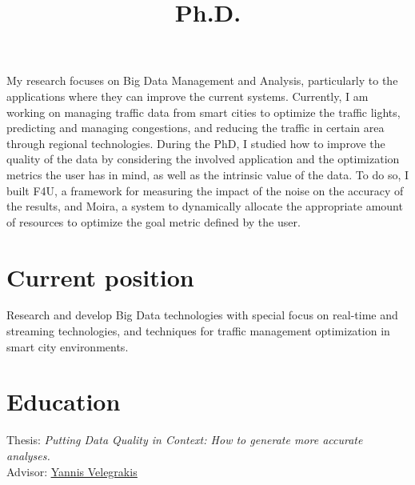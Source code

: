 \documentclass[10pt,a4paper,colorlinks,linkcolor=true]{moderncv}
\title{Ph.D.}
\newcommand{\cvlink}[2]{\href{#1}{\ul{#2}}}
\begin{document}
\hypersetup{urlcolor=color1}

\makecvtitle
\pagestyle{empty} %
\setlength{\parskip}{0.4ex}

\vspace*{-5mm}

My research focuses on Big Data Management and Analysis, particularly to the applications where they can improve the current systems.
Currently, I am working on managing traffic data from smart cities to optimize the traffic lights, predicting and managing congestions, and reducing the traffic in certain area through regional technologies.
During the PhD, I studied how to improve the quality of the data by considering the involved application and the optimization metrics the user has in mind, as well as the intrinsic value of the data.
To do so, I built F4U, a framework for measuring the impact of the noise on the accuracy of the results, and Moira, a system to dynamically allocate the appropriate amount of resources to optimize the goal metric defined by the user.


\section{Current position}

  {Research and develop Big Data technologies with special focus on real-time and streaming technologies, and techniques for traffic management optimization in smart city environments.}


\section{Education}

  {Thesis: \emph{Putting Data Quality in Context: How to generate more accurate analyses.}\\
  Advisor: \cvlink{https://scholar.google.it/citations?user=FI1rYesAAAAJ}{Yannis Velegrakis}}
\end{document}
